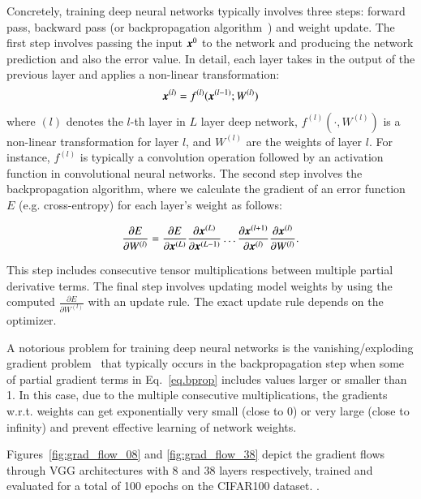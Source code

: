 \documentclass{article}
\begin{document}
\questionFigureThree

Concretely, training deep neural networks typically involves three steps: forward
pass, backward pass (or backpropagation algorithm~\cite{rumelhart1986learning}) and weight update.
The first step involves passing the input $\bm{x}^0$ to the network and producing 
the network prediction and also the error value.
In detail, each layer takes in the output of the previous layer and applies
a non-linear transformation:
\begin{equation}
\label{eq.fprop}
\bm{x}^{(l)} = f^{(l)}(\bm{x}^{(l-1)}; W^{(l)})    
\end{equation} 
where $(l)$ denotes the $l$-th layer in $L$ layer deep network,
$f^{(l)}(\cdot,W^{(l)})$ is a non-linear transformation for layer $l$, and $W^{(l)}$ are the weights of layer $l$.
For instance, $f^{(l)}$ is typically a convolution operation followed by an activation function in convolutional neural networks.
The second step involves the backpropagation algorithm, where we calculate the gradient of an error function $E$ (e.g. cross-entropy) for each layer's weight as follows:

\begin{equation}
    \label{eq.bprop}
\frac{\partial E}{\partial W^{(l)}} = \frac{\partial E}{\partial \bm{x}^{(L)}} \frac{\partial \bm{x}^{(L)}}{\partial \bm{x}^{(L-1)}} \dots \frac{\partial \bm{x}^{(l+1)}}{\partial \bm{x}^{(l)}}\frac{\partial \bm{x}^{(l)}}{\partial W^{(l)}}.
\end{equation}

This step includes consecutive tensor multiplications between multiple
partial derivative terms.
The final step involves updating model weights by using the computed 
$\frac{\partial E}{\partial W^{(l)}}$ with an update rule.
The exact update rule depends on the optimizer.

A notorious problem for training deep neural networks is the vanishing/exploding gradient
problem~\cite{bengio1993problem} that typically occurs in the backpropagation step when some of partial gradient terms in Eq.~\ref{eq.bprop} includes values larger or smaller than 1.
In this case, due to the multiple consecutive multiplications, the gradients w.r.t. weights
can get exponentially very small (close to 0) or very large (close to infinity) and
prevent effective learning of network weights.


%


Figures~\ref{fig:grad_flow_08} and \ref{fig:grad_flow_38} depict the gradient flows through
VGG architectures \cite{simonyan2014very} with 8 and 38 layers respectively,
trained and evaluated for a total of 100 epochs on the 
CIFAR100 dataset. \questionOne.
\end{document}
